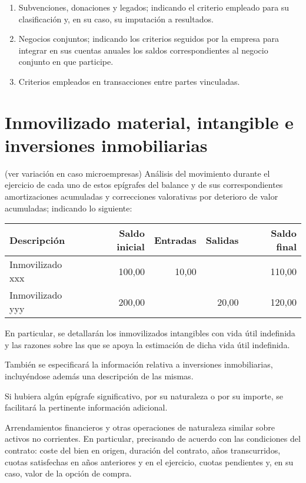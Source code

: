 \documentclass[11pt,a4paper]{article}
\begin{document}
\begin{enumerate}
\item Subvenciones, donaciones y legados; indicando el criterio empleado para su clasificación y, en su caso, su imputación a resultados.

\item Negocios conjuntos; indicando los criterios seguidos por la empresa para integrar en sus cuentas anuales los saldos correspondientes al negocio conjunto en que participe.

\item Criterios empleados en transacciones entre partes vinculadas.

\end{enumerate}

\section{Inmovilizado material, intangible e inversiones inmobiliarias}
(ver variación en caso microempresas)
Análisis del movimiento durante el ejercicio de cada uno de estos epígrafes del balance y de sus correspondientes amortizaciones acumuladas y correcciones valorativas por deterioro de valor acumuladas; indicando lo siguiente:

\begin{center}
\begin{tabular}{|l|r|r|r|r|}
\hline
\textbf {Descripción} & \textbf {Saldo inicial} & \textbf {Entradas} & \textbf {Salidas} & \textbf {Saldo final} \\ 
\hline
Inmovilizado xxx & 100,00 & 10,00 &  & 110,00 \\
\hline
Inmovilizado yyy & 200,00 &  & 20,00 & 120,00 \\
\hline
\end{tabular}
\end{center}


En particular, se detallarán los inmovilizados intangibles con vida útil indefinida y las razones sobre las que se apoya la estimación de dicha vida útil indefinida.

También se especificará la información relativa a inversiones inmobiliarias, incluyéndose además una descripción de las mismas.

Si hubiera algún epígrafe significativo, por su naturaleza o por su importe, se facilitará la pertinente información adicional.

Arrendamientos financieros y otras operaciones de naturaleza similar sobre activos no corrientes. En particular, precisando de acuerdo con las condiciones del contrato: coste del bien en origen, duración del contrato, años transcurridos, cuotas satisfechas en años anteriores y en el ejercicio, cuotas pendientes y, en su caso, valor de la opción de compra.
\end{document}
